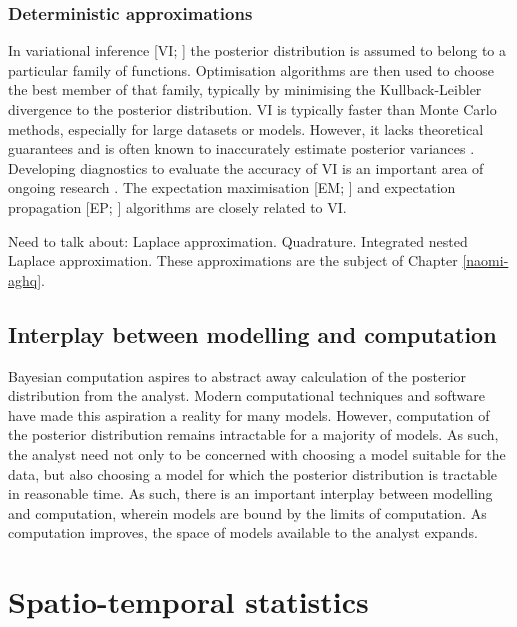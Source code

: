 \documentclass[a4paper, nobind]{templates/ociamthesis}
\begin{document}
\hypertarget{deterministic-approximations}{%
\subsubsection{Deterministic approximations}\label{deterministic-approximations}}

In variational inference {[}VI; \textcite{blei2017variational}{]} the posterior distribution is assumed to belong to a particular family of functions.
Optimisation algorithms are then used to choose the best member of that family, typically by minimising the Kullback-Leibler divergence to the posterior distribution.
VI is typically faster than Monte Carlo methods, especially for large datasets or models.
However, it lacks theoretical guarantees and is often known to inaccurately estimate posterior variances \autocite{giordano2018covariances}.
Developing diagnostics to evaluate the accuracy of VI is an important area of ongoing research \autocite{yao2018yes}.
The expectation maximisation {[}EM; \textcite{dempster1977maximum}{]} and expectation propagation {[}EP; \textcite{minka2001expectation}{]} algorithms are closely related to VI.

Need to talk about:
Laplace approximation.
Quadrature.
Integrated nested Laplace approximation.
These approximations are the subject of Chapter \ref{naomi-aghq}.

\hypertarget{interplay-between-modelling-and-computation}{%
\subsection{Interplay between modelling and computation}\label{interplay-between-modelling-and-computation}}

Bayesian computation aspires to abstract away calculation of the posterior distribution from the analyst.
Modern computational techniques and software have made this aspiration a reality for many models.
However, computation of the posterior distribution remains intractable for a majority of models.
As such, the analyst need not only to be concerned with choosing a model suitable for the data, but also choosing a model for which the posterior distribution is tractable in reasonable time.
As such, there is an important interplay between modelling and computation, wherein models are bound by the limits of computation.
As computation improves, the space of models available to the analyst expands.

\hypertarget{spatio-temporal-statistics}{%
\section{Spatio-temporal statistics}\label{spatio-temporal-statistics}}
\end{document}

